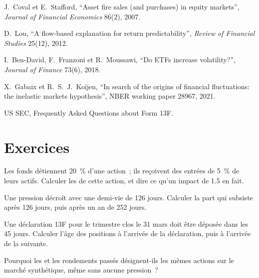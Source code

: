 \begin{omsources}
\item J.~Coval et E.~Stafford, ``Asset fire sales (and purchases) in equity markets'', \emph{Journal of Financial Economics} 86(2), 2007.
\item D.~Lou, ``A flow-based explanation for return predictability'', \emph{Review of Financial Studies} 25(12), 2012.
\item I.~Ben-David, F.~Franzoni et R.~Moussawi, ``Do ETFs increase volatility?'', \emph{Journal of Finance} 73(6), 2018.
\item X.~Gabaix et R.~S.~J.~Koijen, ``In search of the origins of financial fluctuations: the inelastic markets hypothesis'', NBER working paper 28967,
2021.
\item US SEC, Frequently Asked Questions about Form 13F.
\end{omsources}

\section{Exercices}

\begin{exercise}[$\star$]\label{exo:s1:flows:1}
Les fonds détiennent 20~\% d'une action~; ils reçoivent des entrées de 5~\% de leurs actifs. Calculer les  de cette action, et dire ce qu'un impact de 1.5 en fait.
\end{exercise}

\begin{exercise}[$\star$]\label{exo:s1:flows:2}
Une pression décroît avec une demi-vie de 126 jours. Calculer la part qui subsiste après 126 jours, puis après un an de 252 jours.
\end{exercise}

\begin{exercise}[$\star$]\label{exo:s1:flows:3}
Une déclaration 13F pour le trimestre clos le 31 mars doit être déposée dans les 45 jours. Calculer l'âge des positions à l'arrivée de la déclaration, puis à l'arrivée de la suivante.
\end{exercise}

\begin{exercise}[$\star\star$]\label{exo:s1:flows:4}
Pourquoi les  et les rendements passés désignent-ils les mêmes actions sur le marché synthétique, même sans aucune pression~?
\end{exercise}


